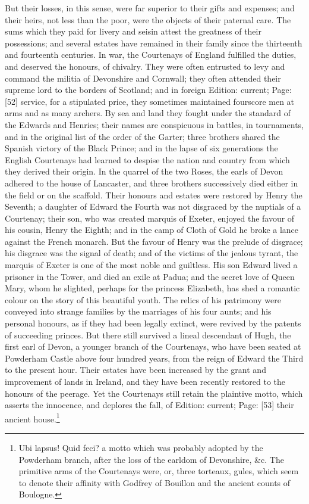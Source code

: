 But their losses, in this sense, were far superior to their gifts and expenses; and their heirs, not less than the poor, were the objects of their paternal care. The sums which they paid for livery and seisin attest the greatness of their possessions; and several estates have remained in their family since the thirteenth and fourteenth centuries. In war, the Courtenays of England fulfilled the duties, and deserved the honours, of chivalry. They were often entrusted to levy and command the militia of Devonshire and Cornwall; they often attended their supreme lord to the borders of Scotland; and in foreign Edition: current; Page: [52] service, for a stipulated price, they sometimes maintained fourscore men at arms and as many archers. By sea and land they fought under the standard of the Edwards and Henries; their names are conspicuous in battles, in tournaments, and in the original list of the order of the Garter; three brothers shared the Spanish victory of the Black Prince; and in the lapse of six generations the English Courtenays had learned to despise the nation and country from which they derived their origin. In the quarrel of the two Roses, the earls of Devon adhered to the house of Lancaster, and three brothers successively died either in the field or on the scaffold. Their honours and estates were restored by Henry the Seventh; a daughter of Edward the Fourth was not disgraced by the nuptials of a Courtenay; their son, who was created marquis of Exeter, enjoyed the favour of his cousin, Henry the Eighth; and in the camp of Cloth of Gold he broke a lance against the French monarch. But the favour of Henry was the prelude of disgrace; his disgrace was the signal of death; and of the victims of the jealous tyrant, the marquis of Exeter is one of the most noble and guiltless. His son Edward lived a prisoner in the Tower, and died an exile at Padua; and the secret love of Queen Mary, whom he slighted, perhaps for the princess Elizabeth, has shed a romantic colour on the story of this beautiful youth. The relics of his patrimony were conveyed into strange families by the marriages of his four aunts; and his personal honours, as if they had been legally extinct, were revived by the patents of succeeding princes. But there still survived a lineal descendant of Hugh, the first earl of Devon, a younger branch of the Courtenays, who have been seated at Powderham Castle above four hundred years, from the reign of Edward the Third to the present hour. Their estates have been increased by the grant and improvement of lands in Ireland, and they have been recently restored to the honours of the peerage. Yet the Courtenays still retain the plaintive motto, which asserts the innocence, and deplores the fall, of Edition: current; Page: [53] their ancient house.\footnote{Ubi lapsus! Quid feci? a motto which was probably adopted by the Powderham branch, after the loss of the earldom of Devonshire, \&c. The primitive arms of the Courtenays were, or, three torteaux, gules, which seem to denote their affinity with Godfrey of Bouillon and the ancient counts of Boulogne.

}
